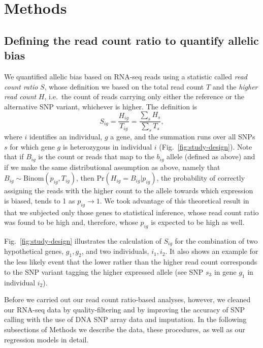 \documentclass[letterpaper]{article}
\begin{document}
\clearpage

\section{Methods}

\subsection{Defining the read count ratio to quantify allelic bias}

We quantified allelic bias based on RNA-seq reads using a statistic called
\emph{read count ratio} \(S\), whose definition we
based on the total read count \(T\) and the \emph{higher read count} \(H\),
i.e.~the count of reads carrying only either the reference or the alternative SNP variant,
whichever is higher.  The
definition is
\begin{equation}
S_{ig} = \frac{H_{ig}}{T_{ig}}= \frac{\sum_s H_s}{\sum_sT_s},
\label{eq:S-definition}
\end{equation}
where \(i\) identifies an individual, \(g\) a gene, and the summation runs
over all SNPs \(s\) for which gene \(g\) is heterozygous in individual \(i\) (Fig.~\ref{fig:study-design}).
Note that if \(B_{ig}\) is the count or reads that map to the \(b_{ig}\) allele
(defined as above) and if we make the same distributional assumption as above, namely that \(B_{ig}\sim
\mathrm{Binom}(p_{ig}, T_{ig})\), then \(\mathrm{Pr}(H_{ig}=B_{ig}|p_{ig})\), the probability of correctly
assigning the reads with the higher count to the allele towards which
expression is biased, tends to 1 as \(p_{ig} \rightarrow 1\).  We took
advantage of this theoretical result in that we subjected only those genes to
statistical inference, whose read count ratio was found to be high and,
therefore, whose \(p_{ig}\) is expected to be high as well.

Fig.~\ref{fig:study-design} illustrates the calculation of \(S_{ig}\) for the
combination of two hypothetical genes, \(g_1,g_2\), and two individuals,
\(i_1,i_2\).  It also shows an example for the less likely event that the lower rather
than the higher read count corresponds to the SNP variant tagging the higher
expressed allele (see SNP \(s_3\) in gene \(g_1\) in individual \(i_2\)).

Before we carried out our read count ratio-based analyses, however, we cleaned
our RNA-seq data by quality-filtering and by improving the accuracy of SNP
calling with the use of DNA SNP array data and imputation. In the following
subsections of Methods we describe the data, these procedures, as well as our
regression models in detail.
\end{document}
